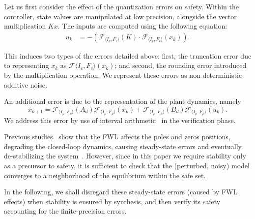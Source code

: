 \documentclass[twocolumn]{autart}    %
\begin{document}
Let us first consider the effect of the quantization errors on safety. 
Within the controller, state values are manipulated at low precision,
alongside the vector multiplication $Kx$.
The inputs are computed using the following equation: 
%
\begin{align*}
u_{k}&=-(\mathcal{F}_{\langle I_c,F_c \rangle}(K)\cdot\mathcal{F}_{\langle I_c,F_c \rangle}(x_{k})). 
\end{align*}

This induces two types of the errors detailed above: first, the truncation
error due to representing $x_k$ as $\mathcal{F}{\langle I_c,F_c
\rangle}(x_{k})$; and second, the rounding error introduced by the
multiplication operation.  We represent these errors as non-deterministic
additive noise.

An additional error is due to the representation of the plant dynamics, namely 
%
{\scriptsize
\begin{equation}
x_{k+1} =\mathcal{F}_{\langle I_p,F_p \rangle}(A_d) \mathcal{F}_{\langle I_p,F_p \rangle}(x_{k}) + \mathcal{F}_{\langle I_p,F_p \rangle}(B_d)\mathcal{F}_{\langle I_p,F_p \rangle}(u_{k}).
\end{equation}
}
We address this error by use of interval
arithmetic~\cite{moore1966interval} in the verification phase.

Previous studies~\cite{gangli1} show that the FWL affects the poles and
zeros positions, degrading the closed-loop dynamics, causing steady-state
errors and eventually de-stabilizing the system~\cite{Bessa16}.  However,
since in this paper we require stability only as a precursor to safety, it
is sufficient to check that the (perturbed, noisy) model converges to a
neighborhood of the equilibrium within the safe set.

In the following, we shall disregard these steady-state errors (caused by
FWL effects) when stability is ensured by synthesis, and then verify its
safety accounting for the finite-precision errors.


\end{document}
